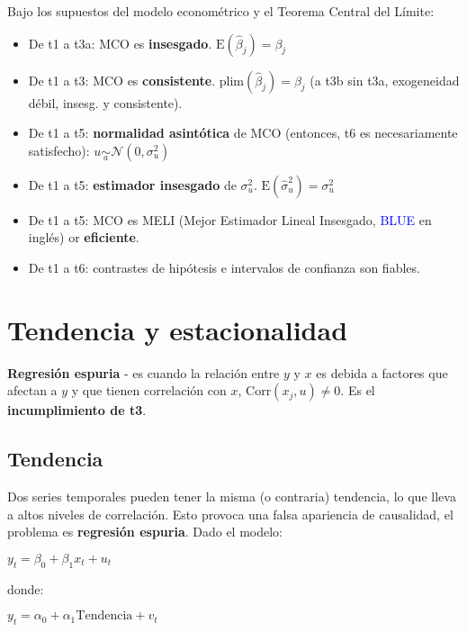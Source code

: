 \documentclass[10pt, a4paper, landscape]{extarticle}
\newcommand{\E}{\mathrm{E}}
\newcommand{\Corr}{\mathrm{Corr}}
\begin{document}
\begin{multicols}{3}
Bajo los supuestos del modelo econométrico y el Teorema Central del Límite:

\begin{itemize}[leftmargin=*]
	\item De t1 a t3a: MCO es \textbf{insesgado}. $\E(\hat{\beta}_j) = \beta_j$
	\item De t1 a t3: MCO es \textbf{consistente}. $\mathrm{plim}(\hat{\beta}_j) = \beta_j$ (a t3b sin t3a, exogeneidad débil, insesg. y consistente).
	\item De t1 a t5: \textbf{normalidad asintótica} de MCO (entonces, t6 es necesariamente satisfecho): $u \underset{a}{\sim} \mathcal{N} (0, \sigma^2_u)$
	\item De t1 a t5: \textbf{estimador insesgado} de $\sigma^2_u$. $\E(\hat{\sigma}^2_u) = \sigma^2_u$
	\item De t1 a t5: MCO es MELI (Mejor Estimador Lineal Insesgado, \textcolor{blue}{BLUE} en inglés) or \textbf{eficiente}. 
	\item De t1 a t6: contrastes de hipótesis e intervalos de confianza son fiables.
\end{itemize}

\columnbreak

\section*{Tendencia y estacionalidad}

\textbf{Regresión espuria} - es cuando la relación entre $y$ y $x$ es debida a factores que afectan a $y$ y que tienen correlación con $x$, $\Corr(x_j, u) \neq 0$. Es el \textbf{incumplimiento de t3}.

\subsection*{Tendencia}

Dos series temporales pueden tener la misma (o contraria) tendencia, lo que lleva a altos niveles de correlación. Esto provoca una falsa apariencia de causalidad, el problema es \textbf{regresión espuria}. Dado el modelo:

\begin{center}
	$y_t = \beta_0 + \beta_1 x_t + u_t$
\end{center}

donde:

\begin{center}
	$y_t = \alpha_0 + \alpha_1 \mathrm{Tendencia} + v_t$


\end{center}
\end{multicols}
\end{document}
